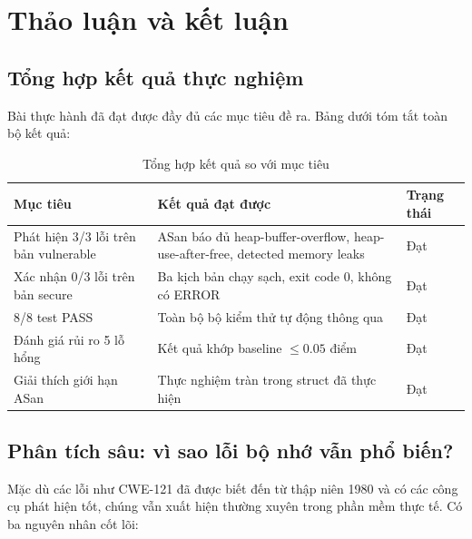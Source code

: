 
\section{Thảo luận và kết luận}
\label{sec:ketluan}

\subsection{Tổng hợp kết quả thực nghiệm}

Bài thực hành đã đạt được đầy đủ các mục tiêu đề ra. Bảng dưới tóm tắt toàn
bộ kết quả:

\begin{table}[H]
\centering
\begin{tabularx}{\textwidth}{|p{4cm}|X|p{2.5cm}|}
\hline
\textbf{Mục tiêu} & \textbf{Kết quả đạt được} & \textbf{Trạng thái} \\ \hline
Phát hiện 3/3 lỗi trên bản vulnerable & ASan báo đủ heap-buffer-overflow, heap-use-after-free, detected memory leaks & Đạt \\ \hline
Xác nhận 0/3 lỗi trên bản secure & Ba kịch bản chạy sạch, exit code 0, không có ERROR & Đạt \\ \hline
8/8 test PASS & Toàn bộ bộ kiểm thử tự động thông qua & Đạt \\ \hline
Đánh giá rủi ro 5 lỗ hổng & Kết quả khớp baseline $\leq 0.05$ điểm & Đạt \\ \hline
Giải thích giới hạn ASan & Thực nghiệm tràn trong struct đã thực hiện & Đạt \\ \hline
\end{tabularx}
\caption{Tổng hợp kết quả so với mục tiêu}
\end{table}

\subsection{Phân tích sâu: vì sao lỗi bộ nhớ vẫn phổ biến?}

Mặc dù các lỗi như CWE-121 đã được biết đến từ thập niên 1980 và có các công
cụ phát hiện tốt, chúng vẫn xuất hiện thường xuyên trong phần mềm thực tế.
Có ba nguyên nhân cốt lõi:

